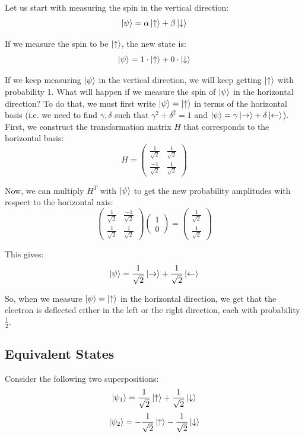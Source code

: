 \documentclass[12pt]{article}
\begin{document}
\noindent
Let us start with measuring the spin in the vertical direction:
\[ \ket{\psi} = \alpha \ket{\uparrow} + \beta \ket{\downarrow} \]

\noindent
If we measure the spin to be $\ket{\uparrow}$, the new state is:
\[ \ket{\psi} = 1 \cdot \ket{\uparrow} + 0 \cdot \ket{\downarrow} \]

\noindent
If we keep measuring $\ket{\psi}$ in the vertical direction, we will keep getting $\ket{\uparrow}$ with probability 1.
What will happen if we measure the spin of $\ket{\psi}$ in the horizontal direction?
To do that, we must first write $\ket{\psi} = \ket{\uparrow}$ in terms of the horizontal basis (i.e. we need to find $\gamma, \delta$ such that $\gamma^2 + \delta^2 = 1$ and $\ket{\psi} = \gamma \ket{\rightarrow} + \delta \ket{\leftarrow}$).
First, we construct the transformation matrix $H$ that corresponds to the horizontal basis:
\[ H = \begin{pmatrix}
    \frac{1}{\sqrt{2}} & \frac{1}{\sqrt{2}} \\
    \frac{-1}{\sqrt{2}} & \frac{1}{\sqrt{2}}
\end{pmatrix} \]

\noindent
Now, we can multiply $H^T$ with $\ket{\psi}$ to get the new probability amplitudes with respect to the horizontal axis:
\[ \begin{pmatrix}
    \frac{1}{\sqrt{2}} & \frac{-1}{\sqrt{2}} \\
    \frac{1}{\sqrt{2}} & \frac{1}{\sqrt{2}}
\end{pmatrix} \begin{pmatrix}
    1 \\
    0
\end{pmatrix} = \begin{pmatrix}
    \frac{1}{\sqrt{2}} \\
    \frac{1}{\sqrt{2}}
\end{pmatrix} \]

\noindent
This gives:
\[ \ket{\psi} = \frac{1}{\sqrt{2}}\ket{\rightarrow} + \frac{1}{\sqrt{2}}\ket{\leftarrow} \]

\noindent
So, when we measure $\ket{\psi} = \ket{\uparrow}$ in the horizontal direction, we get that the electron is deflected either in the left or the right direction, each with probability $\frac{1}{2}$.

\subsection*{Equivalent States}
Consider the following two superpositions:
\[ \ket{\psi_1} = \frac{1}{\sqrt{2}}\ket{\uparrow} + \frac{1}{\sqrt{2}}\ket{\downarrow} \]
\[ \ket{\psi_2} = -\frac{1}{\sqrt{2}}\ket{\uparrow} - \frac{1}{\sqrt{2}}\ket{\downarrow} \]
\end{document}
